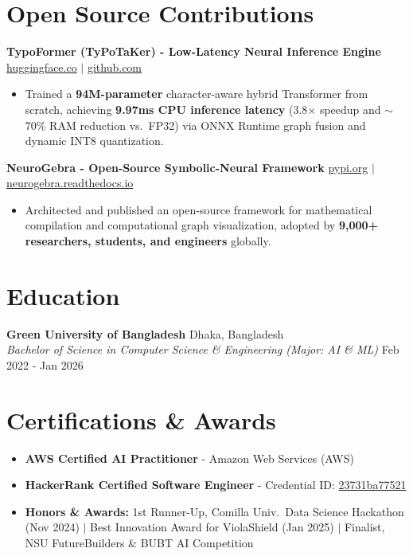 \documentclass[9.5pt,a4paper]{article}
\begin{document}
\section*{Open Source Contributions}
\noindent
\textbf{TypoFormer (TyPoTaKer) - Low-Latency Neural Inference Engine} \hfill \href{https://huggingface.co/fahiiim/TypoFormer}{huggingface.co} $\vert$ \href{https://github.com/fahiiim/TyPoTaKer}{github.com}
\begin{itemize}
    \item Trained a \textbf{94M-parameter} character-aware hybrid Transformer from scratch, achieving \textbf{9.97ms CPU inference latency} (3.8$\times$ speedup and $\sim$70\% RAM reduction vs.\ FP32) via ONNX Runtime graph fusion and dynamic INT8 quantization.
\end{itemize}
\vspace{0.6pt}
\noindent
\textbf{NeuroGebra - Open-Source Symbolic-Neural Framework} \hfill \href{https://pypi.org/project/neurogebra/}{pypi.org} $\vert$ \href{https://neurogebra.readthedocs.io}{neurogebra.readthedocs.io}
\begin{itemize}
    \item Architected and published an open-source framework for mathematical compilation and computational graph visualization, adopted by \textbf{9,000+ researchers, students, and engineers} globally.
\end{itemize}
\vspace{0.6pt}

\section*{Education}
\noindent
\textbf{Green University of Bangladesh} \hfill Dhaka, Bangladesh\\
\textit{Bachelor of Science in Computer Science \& Engineering (Major: AI \& ML)} \hfill Feb 2022 - Jan 2026

\section*{Certifications \& Awards}
\begin{itemize}
    \item \textbf{AWS Certified AI Practitioner} - Amazon Web Services (AWS)
    \item \textbf{HackerRank Certified Software Engineer} - Credential ID: \href{https://www.hackerrank.com/certificates/23731ba77521}{23731ba77521}
    \item \textbf{Honors \& Awards:} 1st Runner-Up, Comilla Univ.\ Data Science Hackathon (Nov 2024) $\vert$ Best Innovation Award for ViolaShield (Jan 2025) $\vert$ Finalist, NSU FutureBuilders \& BUBT AI Competition
\end{itemize}
\end{document}
